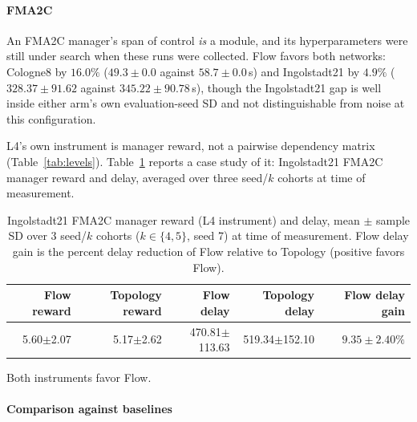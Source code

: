 \documentclass[journal]{IEEEtran}
\theoremstyle{definition}
\begin{document}
\paragraph{FMA2C}
An FMA2C manager's span of control \emph{is} a module, and its hyperparameters were still under search when these runs were collected. Flow favors both networks: Cologne8 by $16.0\%$ ($49.3\pm0.0$ against $58.7\pm0.0$\,s) and Ingolstadt21 by $4.9\%$ ($328.37\pm91.62$ against $345.22\pm90.78$\,s), though the Ingolstadt21 gap is well inside either arm's own evaluation-seed SD and not distinguishable from noise at this configuration.

L4's own instrument is manager reward, not a pairwise dependency matrix (Table~\ref{tab:levels}).
Table~\ref{tab:fma2c-manager} reports a case study of it: Ingolstadt21 FMA2C manager reward and delay, averaged over three seed/$k$ cohorts at time of measurement.

\begin{table}[t]
    \centering
    \caption{Ingolstadt21 FMA2C manager reward (L4 instrument) and delay,
        mean $\pm$ sample SD over 3 seed/$k$ cohorts ($k\in\{4,5\}$, seed 7)
        at time of measurement. Flow delay gain is the percent delay
        reduction of Flow relative to Topology (positive favors Flow).}
    \label{tab:fma2c-manager}
    \scriptsize
    \setlength{\tabcolsep}{3pt}
    \begin{tabular}{rrrrr}
        \toprule
        Flow reward   & Topology reward & Flow delay        & Topology delay    & Flow delay gain \\
        \midrule
        5.60$\pm$2.07 & 5.17$\pm$2.62   & 470.81$\pm$113.63 & 519.34$\pm$152.10 & $9.35\pm2.40\%$ \\
        \bottomrule
    \end{tabular}
\end{table}

Both instruments favor Flow.

\paragraph{Comparison against baselines}
\end{document}
